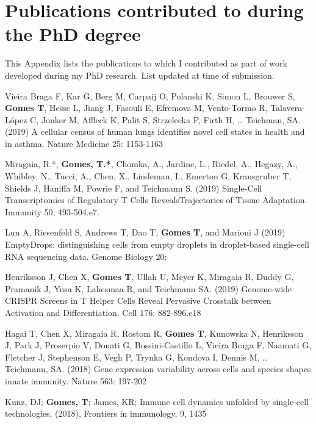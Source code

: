
\chapter{Publications contributed to during the PhD degree} \label{appendix:pubs}
This Appendix lists the publications to which I contributed as part of work developed during my PhD research. List updated at time of submission.\newline

Vieira Braga F, Kar G, Berg M, Carpaij O, Polanski K, Simon L, Brouwer S, \textbf{Gomes T}, Hesse L, Jiang J, Fasouli E, Efremova M, Vento-Tormo R, Talavera-López C, Jonker M, Affleck K, Palit S, Strzelecka P, Firth H, … Teichman, SA. (2019) A cellular census of human lungs identifies novel cell states in health and in asthma. Nature Medicine 25: 1153-1163\newline

Miragaia, R.*, \textbf{Gomes, T.*}, Chomka, A., Jardine, L., Riedel, A., Hegazy, A., Whibley, N., Tucci, A., Chen, X., Lindeman, I., Emerton G, Krausgruber T, Shields J, Haniffa M, Powrie F, and Teichmann S. (2019) Single-Cell Transcriptomics of Regulatory T Cells RevealsTrajectories of Tissue Adaptation. Immunity 50, 493-504.e7.\newline

Lun A, Riesenfeld S, Andrews T, Dao T, \textbf{Gomes T}, and Marioni J (2019) EmptyDrops: distinguishing cells from empty droplets in droplet-based single-cell RNA sequencing data. Genome Biology 20:\newline

Henriksson J, Chen X, \textbf{Gomes T}, Ullah U, Meyer K, Miragaia R, Duddy G, Pramanik J, Yusa K, Lahesmaa R, and Teichmann SA. (2019) Genome-wide CRISPR Screens in T Helper Cells Reveal Pervasive Crosstalk between Activation and Differentiation. Cell 176: 882-896.e18\newline

Hagai T, Chen X, Miragaia R, Rostom R, \textbf{Gomes T}, Kunowska N, Henriksson J, Park J, Proserpio V, Donati G, Bossini-Castillo L, Vieira Braga F, Naamati G, Fletcher J, Stephenson E, Vegh P, Trynka G, Kondova I, Dennis M, … Teichmann, SA. (2018) Gene expression variability across cells and species shapes innate immunity. Nature 563: 197-202\newline

Kunz, DJ; \textbf{Gomes, T}; James, KR; Immune cell dynamics unfolded by single-cell technologies, (2018), Frontiers in immunology, 9, 1435\newline

